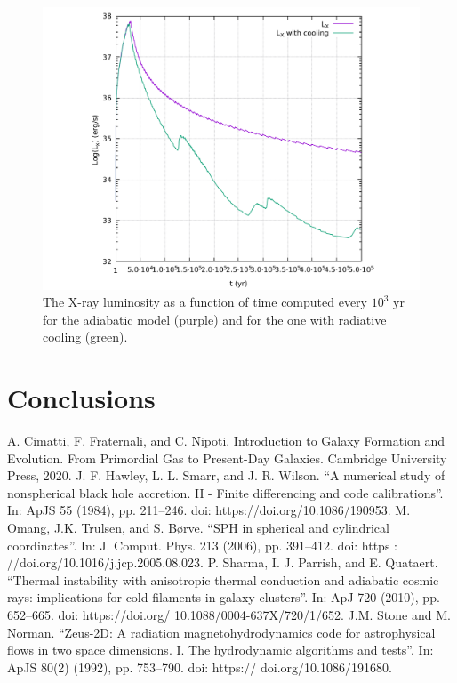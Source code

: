 \documentclass{article}
\begin{document}
\begin{figure}[H]
	\centering
	\includegraphics[width=0.8 \linewidth]{luminosity.pdf}
	\caption{The X-ray luminosity as a function of time computed every $10^3$ yr for the adiabatic model (purple) and for the one with radiative cooling (green).}

	\label{fig:luminosity}
\end{figure}
\section*{Conclusions}

\begin{thebibliography}{5}
	A. Cimatti, F. Fraternali, and C. Nipoti. Introduction to Galaxy Formation and Evolution.
From Primordial Gas to Present-Day Galaxies. Cambridge University Press, 2020.
	J. F. Hawley, L. L. Smarr, and J. R. Wilson. “A numerical study of nonspherical
black hole accretion. II - Finite differencing and code calibrations”. In: ApJS
55 (1984), pp. 211–246. doi: https://doi.org/10.1086/190953.
M. Omang, J.K. Trulsen, and S. Børve. “SPH in spherical and cylindrical
coordinates”. In: J. Comput. Phys. 213 (2006), pp. 391–412. doi: https :
//doi.org/10.1016/j.jcp.2005.08.023.
P. Sharma, I. J. Parrish, and E. Quataert. “Thermal instability with anisotropic
thermal conduction and adiabatic cosmic rays: implications for cold filaments
in galaxy clusters”. In: ApJ 720 (2010), pp. 652–665. doi: https://doi.org/
10.1088/0004-637X/720/1/652.
J.M. Stone and M. Norman. “Zeus-2D: A radiation magnetohydrodynamics
code for astrophysical flows in two space dimensions. I. The hydrodynamic
algorithms and tests”. In: ApJS 80(2) (1992), pp. 753–790. doi: https://
doi.org/10.1086/191680.
\end{thebibliography}
\end{document}
